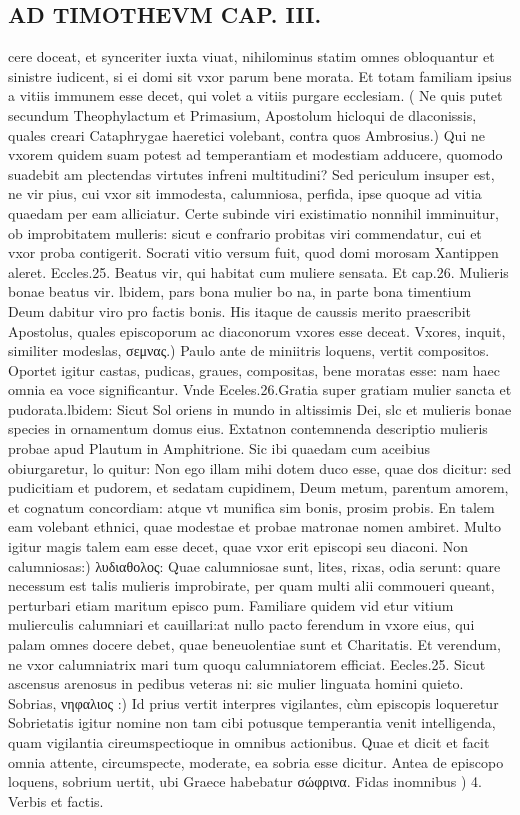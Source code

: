\documentclass{article}
\begin{document}
\begin{pages}
\section*{AD TIMOTHEVM CAP. III. }
\marginpar{[ p.85 ]}\pstart cere doceat, et synceriter iuxta viuat, nihilominus statim omnes obloquantur et sinistre iudicent, si ei domi sit vxor parum bene morata. Et totam familiam ipsius a vitiis immunem esse decet, qui volet a vitiis purgare ecclesiam. ( Ne quis putet secundum Theophylactum et Primasium, Apostolum hicloqui de dlaconissis, quales creari Cataphrygae haeretici volebant, contra quos Ambrosius.) Qui ne vxorem quidem suam potest ad temperantiam et modestiam adducere, quomodo suadebit am plectendas virtutes infreni multitudini? Sed periculum insuper est, ne vir pius, cui vxor sit immodesta, calumniosa, perfida, ipse quoque ad vitia quaedam per eam alliciatur. Certe subinde viri existimatio nonnihil imminuitur, ob improbitatem mulleris: sicut e confrario probitas viri commendatur, cui et vxor proba contigerit. Socrati vitio versum fuit, quod domi morosam Xantippen aleret. Eccles.25. Beatus vir, qui habitat cum muliere sensata. Et cap.26. Mulieris bonae beatus vir. lbidem, pars bona mulier bo na, in parte bona timentium Deum dabitur viro pro factis bonis. His itaque de caussis merito praescribit Apostolus, quales episcoporum ac diaconorum vxores esse deceat.  \pend\pstart Vxores, inquit, similiter modeslas, σεμνας.) Paulo ante de miniitris loquens, vertit compositos. Oportet igitur castas, pudicas, graues, compositas, bene moratas esse: nam haec omnia ea voce significantur. Vnde Eceles.26.Gratia super gratiam mulier sancta et pudorata.lbidem: Sicut Sol oriens in mundo in altissimis Dei, slc et mulieris bonae species in ornamentum domus eius. Extatnon contemnenda descriptio mulieris probae apud Plautum in Amphitrione. Sic ibi quaedam cum aceibius obiurgaretur, lo quitur: Non ego illam mihi dotem duco esse, quae dos dicitur: sed pudicitiam et pudorem, et sedatam cupidinem, Deum metum, parentum amorem, et cognatum concordiam: atque vt munifica sim bonis, prosim probis. En talem eam volebant ethnici, quae modestae et probae matronae nomen ambiret. Multo igitur magis talem eam esse decet, quae vxor erit episcopi seu diaconi.  \pend\pstart Non calumniosas:) λυδιαθολος: Quae calumniosae sunt, lites, rixas, odia serunt: quare necessum est talis mulieris improbirate, per quam multi alii commoueri queant, perturbari etiam maritum episco pum. Familiare quidem vid etur vitium mulierculis calumniari et cauillari:at nullo pacto ferendum in vxore eius, qui palam omnes docere debet, quae beneuolentiae sunt et Charitatis. Et verendum, ne vxor calumniatrix mari tum quoqu calumniatorem efficiat. Eecles.25. Sicut ascensus arenosus in pedibus veteras ni: sic mulier linguata homini quieto.  \pend\pstart Sobrias, νηφαλιος :) Id prius vertit interpres vigilantes, cùm episcopis loqueretur Sobrietatis igitur nomine non tam cibi potusque temperantia venit intelligenda, quam vigilantia cireumspectioque in omnibus actionibus. Quae et dicit et facit omnia attente, circumspecte, moderate, ea sobria esse dicitur. Antea de episcopo loquens, sobrium uertit, ubi Graece habebatur σώφρινα.  \pend\pstart Fidas inomnibus ) 4. Verbis et factis. 
\end{pages}
\end{document}
